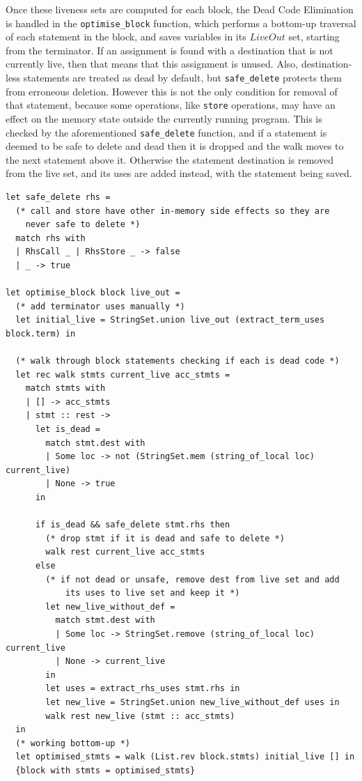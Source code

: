 \documentclass[11pt, a4paper]{article}
\begin{document}
\medskip

Once these liveness sets are computed for each block, the Dead Code Elimination is handled in the \texttt{optimise\_block} function,
which performs a bottom-up traversal of each statement in the block, and saves variables in its $LiveOut$ set, starting from the terminator.
If an assignment is found with a destination that is not currently live, then that means that this assignment is unused. Also, destination-less
statements are treated as dead by default, but \texttt{safe\_delete} protects them from erroneous deletion. However this is not the 
only condition for removal of that statement, because some operations, like \texttt{store} operations, may have an effect on the memory state 
outside the currently running program. This is checked by the aforementioned \texttt{safe\_delete} function, and if a statement is deemed to be safe to delete and dead
then it is dropped and the walk moves to the next statement above it. Otherwise the statement destination is removed from the live set, 
and its uses are added instead, with the statement being saved.

\medskip

\begin{lstlisting}[language={[Objective]Caml}]
let safe_delete rhs =
  (* call and store have other in-memory side effects so they are 
    never safe to delete *)
  match rhs with
  | RhsCall _ | RhsStore _ -> false
  | _ -> true

let optimise_block block live_out =
  (* add terminator uses manually *)
  let initial_live = StringSet.union live_out (extract_term_uses block.term) in

  (* walk through block statements checking if each is dead code *)
  let rec walk stmts current_live acc_stmts =
    match stmts with
    | [] -> acc_stmts
    | stmt :: rest ->
      let is_dead =
        match stmt.dest with
        | Some loc -> not (StringSet.mem (string_of_local loc) current_live)
        | None -> true
      in

      if is_dead && safe_delete stmt.rhs then
        (* drop stmt if it is dead and safe to delete *)
        walk rest current_live acc_stmts
      else
        (* if not dead or unsafe, remove dest from live set and add 
            its uses to live set and keep it *)
        let new_live_without_def =
          match stmt.dest with
          | Some loc -> StringSet.remove (string_of_local loc) current_live
          | None -> current_live
        in
        let uses = extract_rhs_uses stmt.rhs in
        let new_live = StringSet.union new_live_without_def uses in
        walk rest new_live (stmt :: acc_stmts)
  in
  (* working bottom-up *)
  let optimised_stmts = walk (List.rev block.stmts) initial_live [] in
  {block with stmts = optimised_stmts}
\end{lstlisting}
\end{document}
